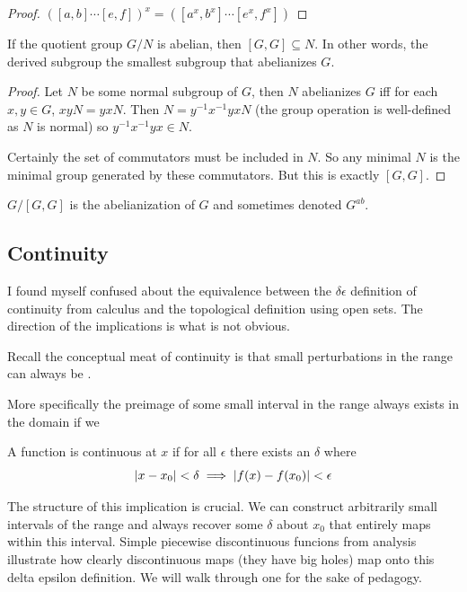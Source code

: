 \documentclass[10pt]{article}
\begin{document}
\begin{proof}
	$([a, b] \cdots [e, f])^x = ([a^x, b^x] \cdots [e^x, f^x])$
\end{proof}

\begin{theorem}
	If the quotient group $G / N$ is abelian, then $[G, G] \subseteq N$. In other
	words, the derived subgroup the smallest subgroup that abelianizes $G$.
\end{theorem}

\begin{proof}
	Let $N$ be some normal subgroup of $G$, then $N$ abelianizes $G$ iff for each
	$x, y \in G$, $xyN = yxN$. Then $N = y^{-1}x^{-1}yxN$ (the group operation is
	well-defined as $N$ is normal) so $y^{-1}x^{-1}yx \in N$. 

	Certainly the set of commutators must be included in $N$. So any minimal $N$
	is the minimal group generated by these commutators. But this is exactly $[G,
	G]$.
\end{proof}

\begin{definition}
	$G / [G, G]$ is the abelianization of $G$ and sometimes denoted $G^{ab}$.
\end{definition}


\subsection{Continuity}

I found myself confused about the equivalence between the $\delta \epsilon$
definition of continuity from calculus and the topological definition using
open sets. The direction of the implications is what is not obvious.

Recall the conceptual meat of continuity is that small perturbations in the
range can always be . 

More specifically the preimage of some small interval in the range
always exists in the domain if we

\begin{definition}
	A function is continuous at $x$ if for all $\epsilon$ there exists an
	$\delta$ where
	\[\lvert x - x_0\rvert < \delta \implies \lvert f(x) - f(x_0)\rvert < \epsilon\]
\end{definition}

The structure of this implication is crucial. We can construct arbitrarily
small intervals of the range and always recover some $\delta$ about $x_0$ that
entirely maps within this interval. Simple piecewise discontinuous funcions
from analysis illustrate how clearly discontinuous maps (they have big holes)
map onto this delta epsilon definition. We will walk through one for the sake of
pedagogy.
\end{document}
